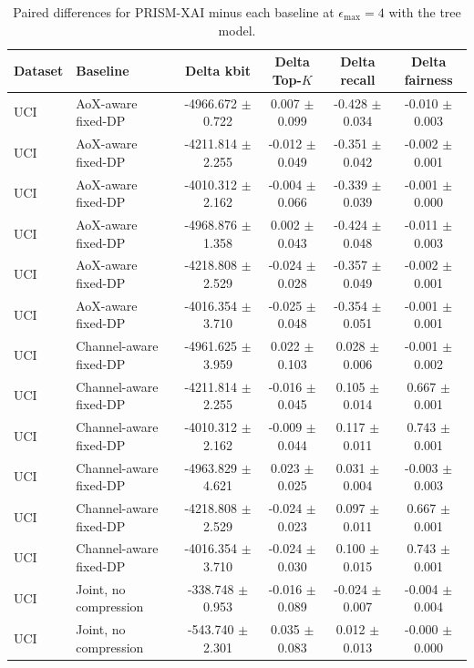 \begin{table}[t]
\caption{Paired differences for PRISM-XAI minus each baseline at $\epsilon_{\max}=4$ with the tree model.}
\label{tab:paired-differences}
\centering
\scriptsize
\setlength{\tabcolsep}{3pt}
\begin{tabular}{llcccc}
\toprule
Dataset & Baseline & Delta kbit & Delta Top-$K$ & Delta recall & Delta fairness \\
\midrule
UCI & AoX-aware fixed-DP & -4966.672 $\pm$ 0.722 & 0.007 $\pm$ 0.099 & -0.428 $\pm$ 0.034 & -0.010 $\pm$ 0.003 \\
UCI & AoX-aware fixed-DP & -4211.814 $\pm$ 2.255 & -0.012 $\pm$ 0.049 & -0.351 $\pm$ 0.042 & -0.002 $\pm$ 0.001 \\
UCI & AoX-aware fixed-DP & -4010.312 $\pm$ 2.162 & -0.004 $\pm$ 0.066 & -0.339 $\pm$ 0.039 & -0.001 $\pm$ 0.000 \\
UCI & AoX-aware fixed-DP & -4968.876 $\pm$ 1.358 & 0.002 $\pm$ 0.043 & -0.424 $\pm$ 0.048 & -0.011 $\pm$ 0.003 \\
UCI & AoX-aware fixed-DP & -4218.808 $\pm$ 2.529 & -0.024 $\pm$ 0.028 & -0.357 $\pm$ 0.049 & -0.002 $\pm$ 0.001 \\
UCI & AoX-aware fixed-DP & -4016.354 $\pm$ 3.710 & -0.025 $\pm$ 0.048 & -0.354 $\pm$ 0.051 & -0.001 $\pm$ 0.001 \\
UCI & Channel-aware fixed-DP & -4961.625 $\pm$ 3.959 & 0.022 $\pm$ 0.103 & 0.028 $\pm$ 0.006 & -0.001 $\pm$ 0.002 \\
UCI & Channel-aware fixed-DP & -4211.814 $\pm$ 2.255 & -0.016 $\pm$ 0.045 & 0.105 $\pm$ 0.014 & 0.667 $\pm$ 0.001 \\
UCI & Channel-aware fixed-DP & -4010.312 $\pm$ 2.162 & -0.009 $\pm$ 0.044 & 0.117 $\pm$ 0.011 & 0.743 $\pm$ 0.001 \\
UCI & Channel-aware fixed-DP & -4963.829 $\pm$ 4.621 & 0.023 $\pm$ 0.025 & 0.031 $\pm$ 0.004 & -0.003 $\pm$ 0.003 \\
UCI & Channel-aware fixed-DP & -4218.808 $\pm$ 2.529 & -0.024 $\pm$ 0.023 & 0.097 $\pm$ 0.011 & 0.667 $\pm$ 0.001 \\
UCI & Channel-aware fixed-DP & -4016.354 $\pm$ 3.710 & -0.024 $\pm$ 0.030 & 0.100 $\pm$ 0.015 & 0.743 $\pm$ 0.001 \\
UCI & Joint, no compression & -338.748 $\pm$ 0.953 & -0.016 $\pm$ 0.089 & -0.024 $\pm$ 0.007 & -0.004 $\pm$ 0.004 \\
UCI & Joint, no compression & -543.740 $\pm$ 2.301 & 0.035 $\pm$ 0.083 & 0.012 $\pm$ 0.013 & -0.000 $\pm$ 0.000 \\

\end{tabular}
\end{table}
